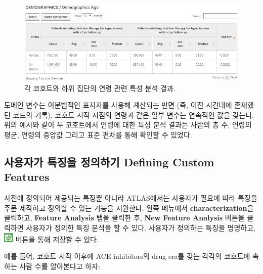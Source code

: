 \documentclass[10.5pt]{book}
\theoremstyle{definition}
\theoremstyle{definition}
\theoremstyle{definition}
\theoremstyle{remark}
\begin{document}
\begin{figure}

{\centering \includegraphics[width=1\linewidth]{images/Characterization/atlasCharacterizationResultsContinuous} 

}

\caption{각 코호트와 하위 집단의 연령 관련 특성 분석 결과.}\label{fig:atlasCharacterizationResultsContinuous}
\end{figure}

도메인 변수는 이분법적인 표지자를 사용해 계산되는 반면 (즉, 이전
시간대에 존재했던 코드의 기록), 코호트 시작 시점의 연령과 같은 일부
변수는 연속적인 값을 갖는다. 위의 예시와 같이 두 코호트에서 연령에 대한
특성 분석 결과는 사람의 총 수, 연령의 평균, 연령의 중앙값 그리고 표준
편차를 통해 확인할 수 있었다.

\subsection{사용자가 특징을 정의하기 Defining Custom
Features}\label{---defining-custom-features}

사전에 정의되어 제공되는 특징뿐 아니라 ATLAS에서는 사용자가 필요에 따라
특징을 주문 제작하고 정의할 수 있는 기능을 지원한다. 왼쪽 메뉴에서
\textbf{characterization}을 클릭하고, \textbf{Feature Analysis} 탭을
클릭한 후, \textbf{New Feature Analysis} 버튼을 클릭하면 사용자가 정의한
특징 분석을 할 수 있다. 사용자가 정의하는 특징을 명명하고,
\includegraphics{images/PopulationLevelEstimation/save.png} 버튼을 통해
저장할 수 있다. 

예를 들어, 코호트 시작 이후에 ACE inhibitors의 drug era를 갖는 각각의
코호트에 속하는 사람 수를 알아본다고 하자:
\end{document}
